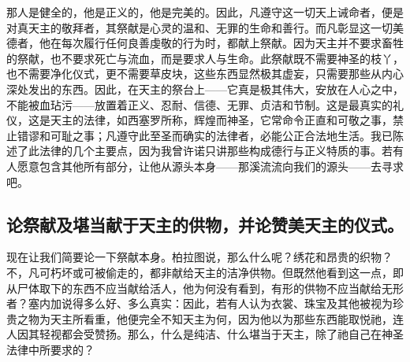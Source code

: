 那人是健全的，他是正义的，他是完美的。因此，凡遵守这一切天上诫命者，便是对真天主的敬拜者，其祭献是心灵的温和、无罪的生命和善行。而凡彰显这一切美德者，他在每次履行任何良善虔敬的行为时，都献上祭献。因为天主并不要求畜牲的祭献，也不要求死亡与流血，而是要求人与生命。此祭献既不需要神圣的枝丫，也不需要净化仪式，更不需要草皮块，这些东西显然极其虚妄，只需要那些从内心深处发出的东西。因此，在天主的祭台上——它真是极其伟大，安放在人心之中，不能被血玷污——放置着正义、忍耐、信德、无罪、贞洁和节制。这是最真实的礼仪，这是天主的法律，如西塞罗所称，辉煌而神圣，它常命令正直和可敬之事，禁止错谬和可耻之事；凡遵守此至圣而确实的法律者，必能公正合法地生活。我已陈述了此法律的几个主要点，因为我曾许诺只讲那些构成德行与正义特质的事。若有人愿意包含其他所有部分，让他从源头本身——那溪流流向我们的源头——去寻求吧。\par


\subsection{论祭献及堪当献于天主的供物，并论赞美天主的仪式。}

现在让我们简要论一下祭献本身。柏拉图说，那么什么呢？绣花和昂贵的织物？不，凡可朽坏或可被偷走的，都非献给天主的洁净供物。但既然他看到这一点，即从尸体取下的东西不应当献给活人，他为何没有看到，有形的供物不应当献给无形者？塞内加说得多么好、多么真实：因此，若有人认为衣裳、珠宝及其他被视为珍贵之物为天主所看重，他便完全不知天主为何，因为他以为那些东西能取悦祂，连人因其轻视都会受赞扬。那么，什么是纯洁、什么堪当于天主，除了祂自己在神圣法律中所要求的？\par

